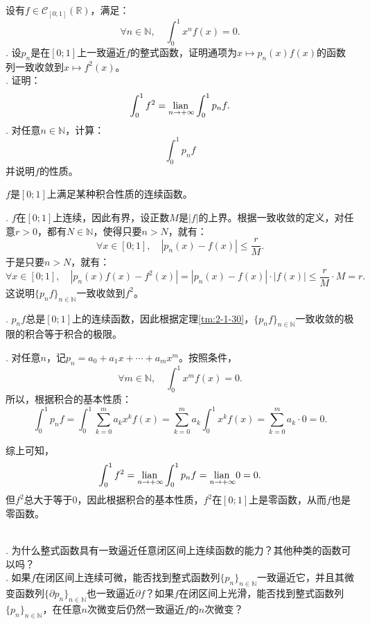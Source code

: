 \documentclass[12pt,UTF8]{ctexbook}
\begin{document}
\begin{et}
    设有$f\in\mathcal{C}_{[0;1]}(\mathbb{R})$，满足：
    $$ \forall n\in \mathbb{N}, \quad \int_0^1 x^n f(x) = 0. $$
    . 设$p_n$是在$[0;1]$上一致逼近$f$的整式函数，证明通项为$x\mapsto p_n(x) f(x)$的函数列一致收敛到$x\mapsto f^2(x)$。\\
    . 证明：
    $$ \int_0^1 f^2 = \underset{n\to +\infty}{\operatorname{lian}\,} \int_0^1 p_n f. $$
    . 对任意$n\in\mathbb{N}$，计算：
    $$ \int_0^1 p_n f $$
    并说明$f$的性质。
\end{et}

\begin{so}
    $f$是$[0;1]$上满足某种积合性质的连续函数。

    . $f$在$[0;1]$上连续，因此有界，设正数$M$是$|f|$的上界。根据一致收敛的定义，对任意$r>0$，都有$N\in \mathbb{N}$，使得只要$n>N$，就有：
    $$ \forall x\in [0;1], \quad |p_n(x) - f(x)| \leqslant \frac{r}{M}. $$
    于是只要$n>N$，就有：
    $$ \forall x\in [0;1], \quad |p_n(x) f(x) - f^2(x)| = |p_n(x) - f(x)| \cdot |f(x)| \leqslant \frac{r}{M} \cdot M = r. $$
    这说明$\{p_n f\}_{n\in\mathbb{N}}$一致收敛到$f^2$。

    . $p_n f$总是$[0;1]$上的连续函数，因此根据定理\ref{tm:2-1-30}，$\{p_n f\}_{n\in\mathbb{N}}$一致收敛的极限的积合等于积合的极限。

    . 对任意$n$，记$p_n = a_0 + a_1 x + \cdots + a_m x^m$。按照条件，
    $$ \forall m\in \mathbb{N}, \quad \int_0^1 x^m f(x) = 0. $$
    所以，根据积合的基本性质：
    $$ \int_0^1 p_n f = \int_0^1 \sum_{k=0}^m a_k x^k f(x) = \sum_{k=0}^m a_k \int_0^1 x^k f(x) = \sum_{k=0}^m a_k \cdot 0 = 0. $$

    综上可知，
    $$ \int_0^1 f^2 = \underset{n\to +\infty}{\operatorname{lian}\,} \int_0^1 p_n f = \underset{n\to +\infty}{\operatorname{lian}\,} 0 = 0. $$
    但$f^2$总大于等于$0$，因此根据积合的基本性质，$f^2$在$[0;1]$上是零函数，从而$f$也是零函数。

\end{so}

\begin{sk}
    \mbox{} \\
    . 为什么整式函数具有一致逼近任意闭区间上连续函数的能力？其他种类的函数可以吗？\\
    . 如果$f$在闭区间上连续可微，能否找到整式函数列$\{p_n\}_{n\in\mathbb{N}}$一致逼近它，并且其微变函数列$\{\partial p_n\}_{n\in\mathbb{N}}$也一致逼近$\partial f$？如果$f$在闭区间上光滑，能否找到整式函数列$\{p_n\}_{n\in\mathbb{N}}$，在任意$n$次微变后仍然一致逼近$f$的$n$次微变？
\end{sk}
\end{document}
